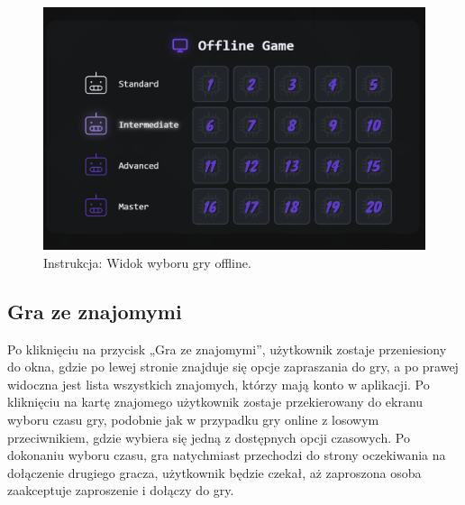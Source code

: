 \documentclass[12pt,a4paper]{article}
\begin{document}
\vspace{0.5cm}
\begin{figure}[h!]
    \centering
    \includegraphics[width=1\textwidth]{images/ins_min_pvc.png}
    \caption{Instrukcja: Widok wyboru gry offline.}
\end{figure}

\newpage

\subsection{Gra ze znajomymi}

Po kliknięciu na przycisk „Gra ze znajomymi”, użytkownik zostaje przeniesiony do okna, gdzie po lewej stronie znajduje się opcje zapraszania do gry, a po prawej widoczna jest lista wszystkich znajomych, którzy mają konto w aplikacji. Po kliknięciu na kartę znajomego użytkownik zostaje przekierowany do ekranu wyboru czasu gry, podobnie jak w przypadku gry online z losowym przeciwnikiem, gdzie wybiera się jedną z dostępnych opcji czasowych. Po dokonaniu wyboru czasu, gra natychmiast przechodzi do strony oczekiwania na dołączenie drugiego gracza, użytkownik będzie czekał, aż zaproszona osoba zaakceptuje zaproszenie i dołączy do gry.
\end{document}
